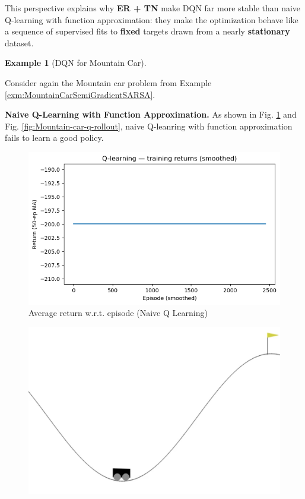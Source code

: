 \documentclass[
]{book}
\theoremstyle{definition}
\theoremstyle{definition}
\newtheorem{example}{Example}[chapter]
\theoremstyle{definition}
\theoremstyle{definition}
\theoremstyle{remark}
\begin{document}
This perspective explains why \textbf{ER + TN} make DQN far more stable than naive Q-learning with function approximation: they make the optimization behave like a sequence of supervised fits to \textbf{fixed} targets drawn from a nearly \textbf{stationary} dataset.

\begin{example}[DQN for Mountain Car]
\protect\hypertarget{exm:MountainCarQLearningFA}{}\label{exm:MountainCarQLearningFA}

Consider again the Mountain car problem from Example \ref{exm:MountainCarSemiGradientSARSA}.

\textbf{Naive Q-Learning with Function Approximation.} As shown in Fig. \ref{fig:Mountain-car-q-episode-return} and Fig. \ref{fig:Mountain-car-q-rollout}, naive Q-leanring with function approximation fails to learn a good policy.

\begin{figure}

{\centering \includegraphics[width=0.6\linewidth]{images/Value-RL/mountain-car_qlearn_naive_eps2500_seed123_returns} 

}

\caption{Average return w.r.t. episode (Naive Q Learning)}\label{fig:Mountain-car-q-episode-return}
\end{figure}

\begin{figure}

{\centering \includegraphics[width=0.6\linewidth]{images/Value-RL/mountain-car_qlearn_naive_eps2500_seed123_greedy-episode-0} 

}
\end{figure}
\end{example}
\end{document}
